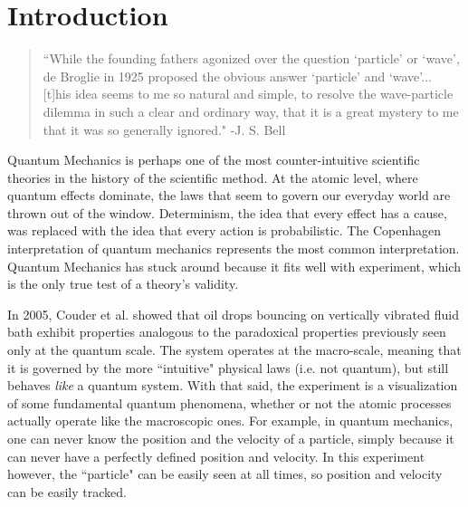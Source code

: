 		
\chapter*{Introduction}
\begin{quote}
	    ``While the founding fathers agonized over the question `particle' or `wave', de Broglie in 1925 proposed the obvious answer `particle' and `wave'... [t]his idea seems to me so natural and simple, to resolve the wave-particle dilemma in such a clear and ordinary way, that it is a great mystery to me that it was so generally ignored." -J. S. Bell
	    \end{quote}
	    

	    


Quantum Mechanics is perhaps one of the most counter-intuitive scientific theories in the history of the scientific method. At the atomic level, where quantum effects dominate, the laws that seem to govern our everyday world are thrown out of the window. Determinism, the idea that every effect has a cause, was replaced with the idea that every action is probabilistic. The Copenhagen interpretation of quantum mechanics represents the most common interpretation. Quantum Mechanics has stuck around because it fits well with experiment, which is the only true test of a theory's validity. 

In 2005, Couder et al. showed that oil drops bouncing on vertically vibrated fluid bath exhibit properties analogous to the paradoxical properties previously seen only at the quantum scale.  The system operates at the macro-scale, meaning that it is governed by the more ``intuitive" physical laws (i.e. not quantum), but still behaves \textit{like} a quantum system. With that said, the experiment is a visualization of some fundamental quantum phenomena, whether or not the atomic processes actually operate like the macroscopic ones. For example, in quantum mechanics, one can never know the position and the velocity of a particle, simply because it can never have a perfectly defined position and velocity. In this experiment however, the ``particle" can be easily seen at all times, so position and velocity can be easily tracked. 

